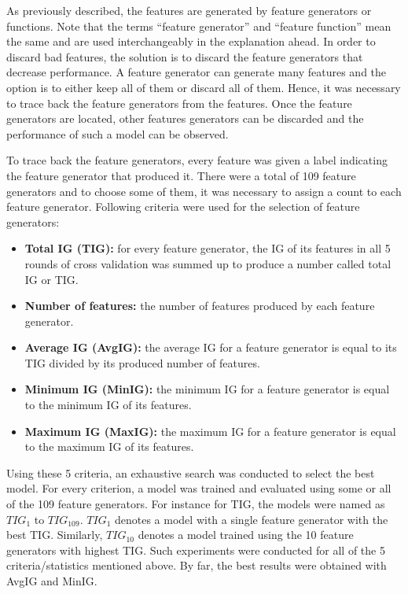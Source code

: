 As previously described, the features are generated by feature generators or functions. Note that the terms ``feature generator'' and ``feature function'' mean the same and are used interchangeably in the explanation ahead. In order to discard bad features, the solution is to discard the feature generators that decrease performance. A feature generator can generate many features and the option is to either keep all of them or discard all of them. Hence, it was necessary to trace back the feature generators from the features. Once the feature generators are located, other features generators can be discarded and the performance of such a model can be observed.

To trace back the feature generators, every feature was given a label indicating the feature generator that produced it. There were a total of 109 feature generators and to choose some of them, it was necessary to assign a count to each feature generator. Following criteria were used for the selection of feature generators:

\begin{itemize}

\item \textbf{Total IG (TIG):} for every feature generator, the IG of its features in all 5 rounds of cross validation was summed up to produce a number called total IG or TIG.

\item \textbf{Number of features:} the number of features produced by each feature generator.

\item \textbf{Average IG (AvgIG):} the average IG for a feature generator is equal to its TIG divided by its produced number of features.

\item \textbf{Minimum IG (MinIG):} the minimum IG for a feature generator is equal to the minimum IG of its features.

\item \textbf{Maximum IG (MaxIG):} the maximum IG for a feature generator is equal to the maximum IG of its features.

\end{itemize}

Using these 5 criteria, an exhaustive search was conducted to select the best model. For every criterion, a model was trained and evaluated using some or all of the 109 feature generators. For instance for TIG, the models were named as $TIG_{1}$ to $TIG_{109}$. $TIG_{1}$ denotes a model with a single feature generator with the best TIG. Similarly, $TIG_{10}$ denotes a model trained using the 10 feature generators with highest TIG. Such experiments were conducted for all of the 5 criteria/statistics mentioned above. By far, the best results were obtained with AvgIG and MinIG.

